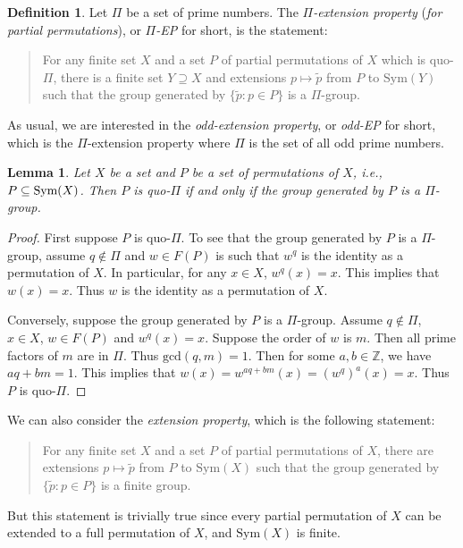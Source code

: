 \documentclass[10pt,a4paper]{amsart}
\newtheorem{lemma}[theorem]{Lemma}
\theoremstyle{definition}
\newtheorem{definition}[theorem]{Definition}
\theoremstyle{definition}
\numberwithin{equation}{section}
\begin{document}
\begin{definition} Let $\Pi$ be a set of prime numbers. The {\em $\Pi$-extension property} ({\em for partial permutations}), or {\em $\Pi$-EP} for short, is the statement:
\begin{quote}
For any finite set $X$ and a set $P$ of partial permutations of $X$ which is quo-$\Pi$, there is a finite set $Y\supseteq X$ and extensions $p\mapsto \tilde{p}$ from $P$ to $\mbox{Sym}(Y)$ such that the group generated by $\{\tilde{p}\colon p\in P\}$ is a $\Pi$-group.
\end{quote}
\end{definition}

As usual, we are interested in the {\em odd-extension property}, or {\em odd-EP} for short, which is the $\Pi$-extension property where $\Pi$ is the set of all odd prime numbers. 

\begin{lemma}\label{lem:fullPi} Let $X$ be a set and $P$ be a set of permutations of $X$, i.e., $P\subseteq\mbox{\rm Sym}(X)$. Then $P$ is quo-$\Pi$ if and only if the group generated by $P$ is a $\Pi$-group.
\end{lemma}

\begin{proof} First suppose $P$ is quo-$\Pi$. To see that the group generated by $P$ is a $\Pi$-group, assume $q\not\in \Pi$ and $w\in F(P)$ is such that $w^q$ is the identity as a permutation of $X$. In particular, for any $x\in X$, $w^q(x)=x$. This implies that $w(x)=x$. Thus $w$ is the identity as a permutation of $X$. 

Conversely, suppose the group generated by $P$ is a $\Pi$-group. Assume $q\not\in\Pi$, $x\in X$, $w\in F(P)$ and $w^q(x)=x$. Suppose the order of $w$ is $m$. Then all prime factors of $m$ are in $\Pi$. Thus $\mbox{gcd}(q, m)=1$. Then for some $a, b\in \mathbb{Z}$, we have $aq+bm=1$. This implies that $w(x)=w^{aq+bm}(x)=(w^q)^a(x)=x$. Thus $P$ is quo-$\Pi$.
\end{proof}

We can also consider the {\em extension property}, which is the following statement:
\begin{quote}
For any finite set $X$ and a set $P$ of partial permutations of $X$, there are extensions $p\mapsto \tilde{p}$ from $P$ to $\mbox{Sym}(X)$ such that the group generated by $\{\tilde{p}\colon p\in P\}$ is a finite group.
\end{quote}
But this statement is trivially true since every partial permutation of $X$ can be extended to a full permutation of $X$, and $\mbox{Sym}(X)$ is finite. 
\end{document}

